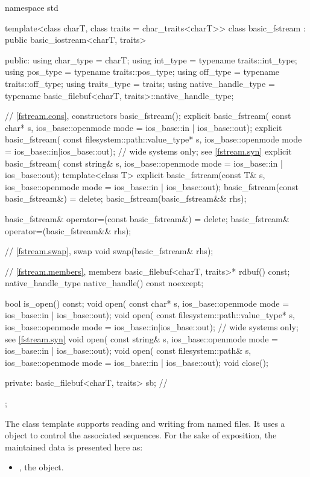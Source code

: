 %
\begin{codeblock}
namespace std {
  template<class charT, class traits = char_traits<charT>>
  class basic_fstream : public basic_iostream<charT, traits> {
  public:
    using char_type   = charT;
    using int_type    = typename traits::int_type;
    using pos_type    = typename traits::pos_type;
    using off_type    = typename traits::off_type;
    using traits_type = traits;
    using native_handle_type = typename basic_filebuf<charT, traits>::native_handle_type;

    // \ref{fstream.cons}, constructors
    basic_fstream();
    explicit basic_fstream(
      const char* s,
      ios_base::openmode mode = ios_base::in | ios_base::out);
    explicit basic_fstream(
      const filesystem::path::value_type* s,
      ios_base::openmode mode = ios_base::in|ios_base::out);    // wide systems only; see \ref{fstream.syn}
    explicit basic_fstream(
      const string& s,
      ios_base::openmode mode = ios_base::in | ios_base::out);
    template<class T>
      explicit basic_fstream(const T& s, ios_base::openmode mode = ios_base::in | ios_base::out);
    basic_fstream(const basic_fstream&) = delete;
    basic_fstream(basic_fstream&& rhs);

    basic_fstream& operator=(const basic_fstream&) = delete;
    basic_fstream& operator=(basic_fstream&& rhs);

    // \ref{fstream.swap}, swap
    void swap(basic_fstream& rhs);

    // \ref{fstream.members}, members
    basic_filebuf<charT, traits>* rdbuf() const;
    native_handle_type native_handle() const noexcept;

    bool is_open() const;
    void open(
      const char* s,
      ios_base::openmode mode = ios_base::in | ios_base::out);
    void open(
      const filesystem::path::value_type* s,
      ios_base::openmode mode = ios_base::in|ios_base::out);    // wide systems only; see \ref{fstream.syn}
    void open(
      const string& s,
      ios_base::openmode mode = ios_base::in | ios_base::out);
    void open(
      const filesystem::path& s,
      ios_base::openmode mode = ios_base::in | ios_base::out);
    void close();

  private:
    basic_filebuf<charT, traits> sb;    // \expos
  };
}
\end{codeblock}

\pnum
The
class template
supports reading and writing from named files.
It uses a
object to control the associated sequences.
For the sake of exposition, the maintained data is presented here as:
\begin{itemize}
\item
{}, the  object.
\end{itemize}

